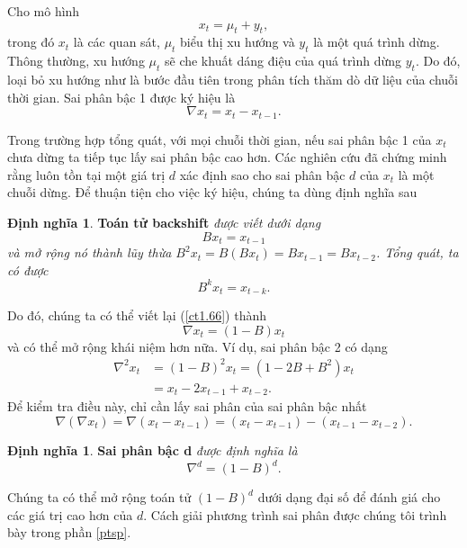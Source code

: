 \documentclass[12pt, a4paper,oneside]{book}
\theoremstyle{definition}
\newtheorem{dn}[theo]{Định nghĩa}
\begin{document}
Cho mô hình
\begin{equation}
x_{t}=\mu_{t}+y_{t}, \label{ct1.63}
\end{equation}
trong đó $x_{t}$ là các quan sát, $ \mu_{t} $ biểu thị xu hướng và $ y_{t} $ là một quá trình dừng. Thông thường, xu hướng $ \mu_{t} $ sẽ che khuất dáng điệu của quá trình dừng $ y_{t} $. Do đó, loại bỏ xu hướng như là bước đầu tiên trong phân tích thăm dò dữ liệu của chuỗi thời gian. Sai phân bậc 1 được ký hiệu là
\begin{equation}
\nabla x_{t}=x_{t}-x_{t-1}. \label{ct1.66}
\end{equation}

Trong trường hợp tổng quát, với mọi chuỗi thời gian, nếu sai phân bậc 1 của $ x_t $ chưa dừng ta tiếp tục lấy sai phân bậc cao hơn. Các nghiên cứu đã chứng minh rằng luôn tồn tại một giá trị $d$ xác định sao cho sai phân bậc $ d $ của $ x_t $ là một chuỗi dừng. Để thuận tiện cho việc ký hiệu, chúng ta dùng định nghĩa sau
\begin{dn}\cite{8} \textbf{Toán tử backshift} \textit{được viết dưới dạng}
	\textit{	\begin{equation}
		Bx_{t}=x_{t-1} \label{ct1.67}
		\end{equation}
		và mở rộng nó thành lũy thừa 	$B^{2}x_{t}=B(Bx_{t})=Bx_{t-1}=Bx_{t-2}$. Tổng quát, ta có được 
		\begin{equation}
		B^{k}x_{t}=x_{t-k}.\label{ct1.68}	
		\end{equation}}
\end{dn} 
Do đó, chúng ta có thể viết lại (\ref{ct1.66}) thành
\begin{equation}
\nabla x_{t}=(1-B)x_{t} \label{ct1.69}
\end{equation}
và có thể mở rộng khái niệm hơn nữa. Ví dụ, sai phân bậc 2 có dạng
\begin{align*}
\nabla^{2} x_{t} &=(1-B)^{2}x_{t}=(1-2B+B^{2})x_{t}\\
&=x_{t}-2x_{t-1}+x_{t-2}.	
\end{align*}
Để kiểm tra điều này, chỉ cần lấy sai phân của sai phân bậc nhất
$$\nabla(\nabla x_{t})=\nabla (x_{t}-x_{t-1})=(x_{t}-x_{t-1})-(x_{t-1}-x_{t-2}).$$
\begin{dn}\cite{8} 
	\textbf{Sai phân bậc d} \textit{được định nghĩa là
		\begin{equation}
		\nabla^{d}=(1-B)^{d}. \label{ct1.70}
		\end{equation}}
\end{dn}
Chúng ta có thể mở rộng toán tử $(1-B)^{d}$ dưới dạng đại số để đánh giá cho các giá trị cao hơn của $d$. Cách giải phương trình sai phân được chúng tôi trình bày trong phần \ref{ptsp}.
\end{document}
